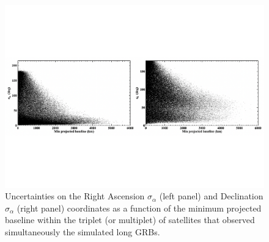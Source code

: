 \documentclass[]{spie}  %
\begin{document}
\begin{figure}[h!]
\centering
\includegraphics[scale=0.6,angle=0]{fig_all_pos_long_sim}
\vspace{-4cm}
\caption{Uncertainties on the Right Ascension $\sigma_\alpha$ (left panel) and Declination $\sigma_\alpha$ (right panel) coordinates as a function of the minimum projected baseline within the triplet (or multiplet) of satellites that observed simultaneously the simulated long GRBs.} 
\label{fig:all_pos_long_sim}
\end{figure}
\end{document}
